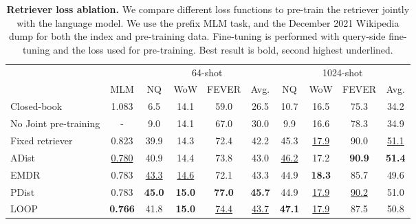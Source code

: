 \documentclass[10pt]{article} \usepackage[preprint]{tmlr}
\begin{document}
\begin{table}[t]
  \centering
  \caption{\textbf{Retriever loss ablation.} 
    We compare different loss functions to pre-train the retriever jointly with the language model.
    We use the prefix MLM task, and the December 2021 Wikipedia dump for both the index and pre-training data.
    Fine-tuning is performed with query-side fine-tuning and the loss used for pre-training. Best result is bold, second highest underlined.
    }
  \vspace{0.5em}
  \label{table:loss_ablation}
  \begin{tabular}{l c cccc cccc}
    \toprule
    && \multicolumn{4}{c}{64-shot} & \multicolumn{4}{c}{1024-shot} \\
    \cmidrule(lr){3-6} \cmidrule(lr){7-10}
    & MLM & NQ & WoW & FEVER & Avg. & NQ & WoW & FEVER & Avg. \\
    \midrule
    Closed-book  & 1.083& 6.5 &14.1 & 59.0 &26.5 & 10.7 & 16.5 & 75.3 & 34.2 \\ No Joint pre-training & -  & 9.0  & 14.1 & 67.0 & 30.0 & 9.9  & 16.6 & 78.3 & 34.9 \\
    Fixed retriever       & 0.823 & 39.9 & 14.3 & 72.4 & 42.2 & 45.3 & \underline{17.9} & 90.0 & \underline{51.1} \\
    ADist                 & \underline{0.780} & 40.9 & 14.4 & 73.8 & 43.0 & \underline{46.2} & 17.2 & \textbf{90.9} & \textbf{51.4} \\
    EMDR              & 0.783 & \underline{43.3} & \underline{14.6} & 72.1 & 43.3 & 44.9 & \textbf{18.3} & 85.7 & 49.6 \\
    PDist                 & 0.783 & \textbf{45.0} & \textbf{15.0} & \textbf{77.0} & \textbf{45.7} & 44.9 & \underline{17.9} & \underline{90.2} & 51.0 \\
    LOOP                  & \textbf{0.766} & 41.8 & \textbf{15.0} & \underline{74.4} & \underline{43.7} & \textbf{47.1} & \underline{17.9} & 87.5 & 50.8 \\
    \bottomrule
  \end{tabular}
\end{table}
\end{document}
